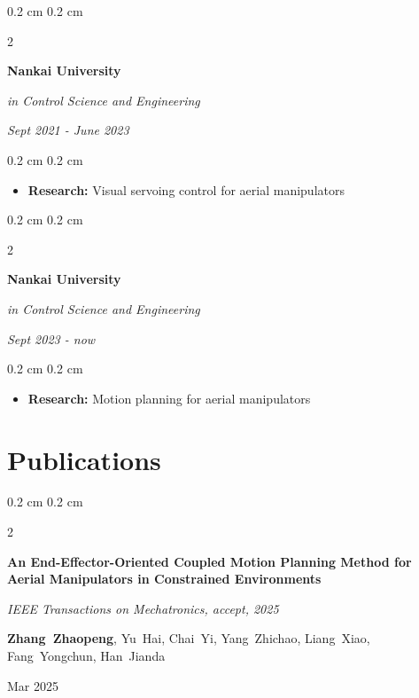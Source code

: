 \documentclass[10pt, letterpaper]{article}
\newenvironment{highlights}{
  \begin{itemize}[
    topsep=0.10 cm,
    parsep=0.10 cm,
    partopsep=0pt,
    itemsep=0pt,
    leftmargin=0.4 cm + 10pt
  ]
}{
    \end{itemize}
} %
\newenvironment{onecolentry}{
    \begin{adjustwidth}{
        0.2 cm
    }{
        0.2 cm
    }
}{
    \end{adjustwidth}
} %
\newenvironment{twocolentry}[2][]{
    \onecolentry
    \def\secondColumn{#2}
    \setcolumnwidth{\fill, 4.5 cm}
    \begin{paracol}{2}
}{
    \switchcolumn \raggedleft \secondColumn
    \end{paracol}
    \endonecolentry
} %
\begin{document}
  \begin{twocolentry}{\textit{Sept 2021 - June 2023}}
    \textbf{Nankai University}

     \textit{in Control Science and Engineering}
  \end{twocolentry}
  
  \vspace{0.1cm}
  
  \begin{onecolentry}
    \begin{highlights}
      \item \textbf{Research:} Visual servoing control for aerial manipulators
    \end{highlights}
  \end{onecolentry}

  \vspace{0.1cm}

  \begin{twocolentry}{\textit{Sept 2023 - now}}
    \textbf{Nankai University}

     \textit{in Control Science and Engineering}
  \end{twocolentry}
  
  \vspace{0.1cm}
  
  \begin{onecolentry}
    \begin{highlights}
      \item \textbf{Research:} Motion planning for aerial manipulators
    \end{highlights}
  \end{onecolentry}

\section{Publications}
\begin{twocolentry}{Mar 2025}
  \textbf{An End-Effector-Oriented Coupled Motion Planning Method for Aerial Manipulators in Constrained Environments}
  \vspace{0.10 cm}

  \textit{IEEE Transactions on Mechatronics, accept, 2025}
  \vspace{0.10 cm}

  \mbox{\textbf{Zhang Zhaopeng}}, \mbox{Yu Hai}, \mbox{Chai Yi}, \mbox{Yang Zhichao}, \mbox{Liang Xiao}, \mbox{Fang Yongchun}, \mbox{Han Jianda}
\end{twocolentry}
\vspace{0.3 cm}
\end{document}
